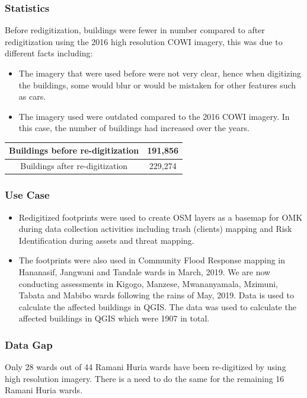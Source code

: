 \documentclass[a4paper,12pt,twoside]{article}
\begin{document}
\subsubsection{Statistics}
Before redigitization, buildings were fewer in number compared to after redigitization using the 2016 high resolution COWI imagery, this was due to different facts including: 
\begin{itemize}
	\item The imagery that were used before were not very clear, hence when digitizing the buildings, some would blur or would be mistaken for other features such as cars.
	\item The imagery used were outdated compared to the 2016 COWI imagery. In this case, the number of buildings had increased over the years.
\end{itemize}
\begin{center}
\begin{tabular}{|c|c|}
\hline
   Buildings before re-digitization & 191,856 \\
\hline
   Buildings after re-digitization & 229,274 \\
\hline
\end{tabular}
\end{center}

\subsubsection{Use Case}
\begin{itemize}
	\item Redigitized footprints were used to create OSM layers as a basemap for OMK during data collection activities including trash (clients) mapping and Risk Identification during assets and threat mapping. 
	\item The footprints were also used in Community Flood Response mapping in Hananasif, Jangwani and Tandale wards in March, 2019. We are now conducting assessments in Kigogo, Manzese, Mwananyamala, Mzimuni, Tabata and Mabibo wards following the rains of May, 2019. Data is used to calculate the affected buildings in QGIS. The data was used to calculate the affected buildings in QGIS which were 1907 in total.
\end{itemize}

\subsubsection{Data Gap}
Only 28 wards out of 44 Ramani Huria wards have been re-digitized by using high resolution imagery. There is a need to do the same for the remaining 16 Ramani Huria wards.
\end{document}
